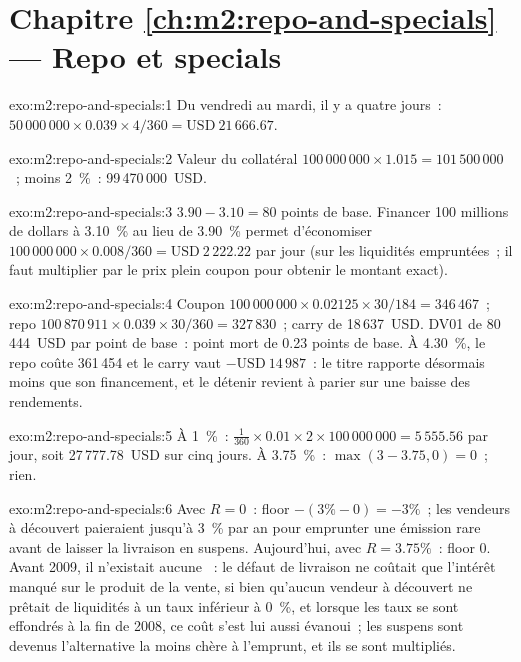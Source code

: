 \section*{Chapitre \ref{ch:m2:repo-and-specials} --- Repo et specials}

\begin{solution}{exo:m2:repo-and-specials:1}
Du vendredi au mardi, il y a quatre jours~: $50\,000\,000 \times 0.039 \times 4/360 =
\text{USD}~21\,666.67$.
\end{solution}

\begin{solution}{exo:m2:repo-and-specials:2}
Valeur du collatéral $100\,000\,000 \times 1.015 = 101\,500\,000$~; moins 2~\%~:
99\,470\,000~USD.
\end{solution}

\begin{solution}{exo:m2:repo-and-specials:3}
 $3.90 - 3.10 = 80$ points de base. Financer 100 millions de dollars à
3.10~\% au lieu de 3.90~\% permet d'économiser $100\,000\,000 \times 0.008/360 =
\text{USD}~2\,222.22$ par jour (sur les liquidités empruntées~; il faut multiplier par le prix plein coupon pour
obtenir le montant exact).
\end{solution}

\begin{solution}{exo:m2:repo-and-specials:4}
Coupon $100\,000\,000 \times 0.02125 \times 30/184 = 346\,467$~; repo $100\,870\,911
\times 0.039 \times 30/360 = 327\,830$~; carry de 18\,637~USD. DV01 de 80\,444~USD par
point de base~: point mort de 0.23 points de base. À 4.30~\%, le repo coûte 361\,454 et
le carry vaut $-\text{USD}~14\,987$~: le titre rapporte désormais moins que son financement,
et le détenir revient à parier sur une baisse des rendements.
\end{solution}

\begin{solution}{exo:m2:repo-and-specials:5}
À 1~\%~: $\frac{1}{360} \times 0.01 \times 2 \times 100\,000\,000 = 5\,555.56$ par
jour, soit 27\,777.78~USD sur cinq jours. À 3.75~\%~: $\max(3 - 3.75, 0) = 0$~; rien.
\end{solution}

\begin{solution}{exo:m2:repo-and-specials:6}
Avec $R = 0$~: floor $-(3\% - 0) = -3\%$~; les vendeurs à découvert paieraient jusqu'à 3~\% par an pour
emprunter une émission rare avant de laisser la livraison en suspens. Aujourd'hui, avec $R = 3.75\%$~: floor 0.
Avant 2009, il n'existait aucune ~: le défaut de livraison ne coûtait que l'intérêt manqué sur
le produit de la vente, si bien qu'aucun vendeur à découvert ne prêtait de liquidités à un taux inférieur à 0~\%, et lorsque les taux se sont effondrés
à la fin de 2008, ce coût s'est lui aussi évanoui~; les suspens sont devenus l'alternative la moins chère
à l'emprunt, et ils se sont multipliés.
\end{solution}

